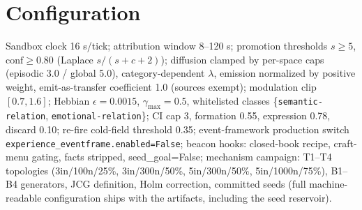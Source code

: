 \documentclass[10pt,a4paper]{article}
\begin{document}
\section{Configuration}
Sandbox clock 16 s/tick; attribution window 8--120 s; promotion thresholds $s\ge5$, $\mathrm{conf}\ge0.80$ (Laplace $s/(s+c+2)$); diffusion clamped by per-space caps (episodic 3.0 / global 5.0), category-dependent $\lambda$, emission normalized by positive weight, emit-as-transfer coefficient 1.0 (sources exempt); modulation clip $[0.7,1.6]$; Hebbian $\epsilon{=}0.0015$, $\gamma_{\max}{=}0.5$, whitelisted classes \{\texttt{semantic-relation}, \texttt{emotional-relation}\}; CI cap 3, formation 0.55, expression 0.78, discard 0.10; re-fire cold-field threshold 0.35; event-framework production switch \texttt{experience\_eventframe.enabled=False}; beacon hooks: closed-book recipe, craft-menu gating, facts stripped, seed\_goal=False; mechanism campaign: T1--T4 topologies (3in/100n/25\%, 3in/300n/50\%, 5in/300n/50\%, 5in/1000n/75\%), B1--B4 generators, JCG definition, Holm correction, committed seeds (full machine-readable configuration ships with the artifacts, including the seed reservoir).
\end{document}
